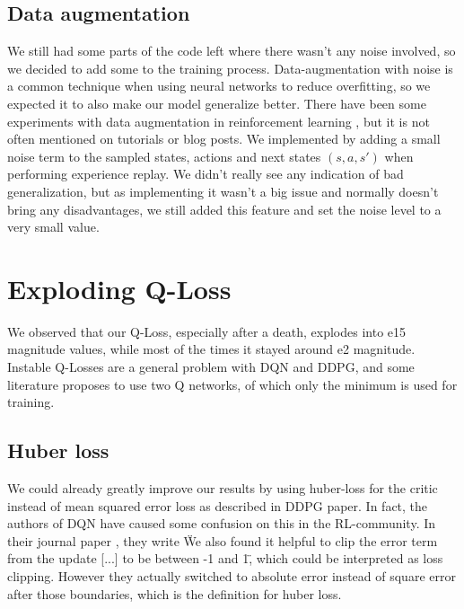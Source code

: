 \documentclass[hyperref,german,beleg]{cgvpub}
\begin{document}
\subsection{Data augmentation}

We still had some parts of the code left where there wasn't any noise involved, so we decided to add some to the training process. Data-augmentation with noise is a common technique when using neural networks \cite[p.347]{bishopNeuralNetworksPattern1995} to reduce overfitting, so we expected it to also make our model generalize better. There have been some experiments with data augmentation in reinforcement learning \cite{cobbeQuantifyingGeneralizationReinforcement2019}, but it is not often mentioned on tutorials or blog posts. We implemented by adding a small noise term to the sampled states, actions and next states \((s, a, s')\) when performing experience replay. We didn't really see any indication of bad generalization, but as implementing it wasn't a big issue and normally doesn't bring any disadvantages, we still added this feature and set the noise level to a very small value.

\section{Exploding Q-Loss}

We observed that our Q-Loss, especially after a death, explodes into e15 magnitude values, while most of the times it stayed around e2 magnitude. Instable Q-Losses are a general problem with DQN and DDPG, and some literature \cite{fujimotoAddressingFunctionApproximation2018} proposes to use two Q networks, of which only the minimum is used for training. 

\subsection{Huber loss}
We could already greatly improve our results by using huber-loss \cite{huber1964} for the critic instead of mean squared error loss as described in DDPG paper. In fact, the authors of \ac{DQN} have caused some confusion on this in the \ac{RL}-community. In their journal paper \cite{mnihHumanlevelControlDeep2015}, they write \"We also found it helpful to clip the error term from the update [...] to be between -1 and 1\", which could be interpreted as loss clipping. However they actually switched to absolute error instead of square error after those boundaries, which is the definition for huber loss.
\end{document}
